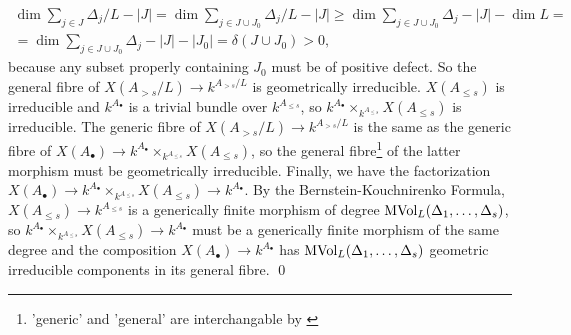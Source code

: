 \begin{multline*}
\dim \sum_{j \in J} \Delta_j/L - |J| = \dim \sum_{j \in J \cup J_0} \Delta_j/L - |J| \ge \dim \sum_{j \in J \cup J_0} \Delta_j - |J| - \dim L
= \\
= \dim \sum_{j \in J \cup J_0} \Delta_j - |J| - |J_0| = \delta(J \cup J_0) > 0,
\end{multline*}
because any subset properly containing $J_0$ must be of positive defect. So the general fibre of $X(A_{> s}/L) \to k^{A_{> s}/L}$ is geometrically irreducible. $X(A_{\le s})$ is irreducible and $k^{A_\bullet}$ is a trivial bundle over $k^{A_{\le s}}$, so $ k^{A_\bullet} \times_{k^{A_{\le s}}} X(A_{\le s})$ is irreducible. The generic fibre of $X(A_{> s}/L) \to k^{A_{> s}/L}$ is the same as the generic fibre of $X(A_\bullet) \to k^{A_\bullet} \times_{k^{A_{\le s}}} X(A_{\le s})$, so the general fibre\footnote{'generic' and 'general' are interchangable by \cite[IV.3, 9.7.8]{EGA}} of the latter morphism must be geometrically irreducible. Finally, we have the factorization $X(A_\bullet) \to k^{A_\bullet} \times_{k^{A_{\le s}}} X(A_{\le s}) \to k^{A_\bullet}$. By the Bernstein-Kouchnirenko Formula, $X(A_{\le s}) \to k^{A_{\le s}}$ is a generically finite morphism of degree $\operatorname{MVol}_L(\Delta_1, \dots, \Delta_s)$, so $ k^{A_\bullet} \times_{k^{A_{\le s}}} X(A_{\le s}) \to k^{A_\bullet}$ must be a generically finite morphism of the same degree and the composition $X(A_\bullet) \to k^{A_\bullet}$ has $\operatorname{MVol}_L(\Delta_1, \dots, \Delta_s)$ geometric irreducible components in its general fibre.
\qed
